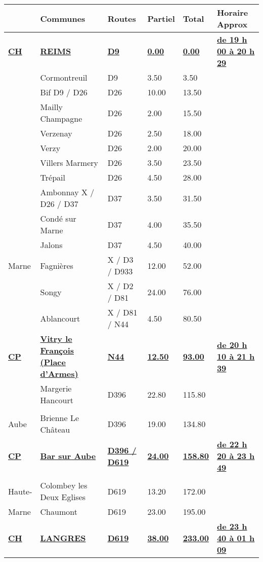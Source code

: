 \documentclass{article}%
\begin{document}
\begin{longtable}{p{2.25cm}|p{6.4cm}|p{2.3cm}|p{1.5cm}|p{1.5cm}|p{3.5cm}}%
\hline%
&Communes&Routes&Partiel&Total&Horaire Approx\\%
\hline%
\endhead%
\endfoot%
\endlastfoot%
\textbf{\underline{﻿CH}}&\textbf{\underline{REIMS}}&\textbf{\underline{D9}}&\textbf{\underline{0.00}}&\textbf{\underline{0.00}}&\textbf{\underline{de 19 h 00 à 20 h 29}}\\%
 &Cormontreuil&D9&3.50&3.50& \\%
 &Bif D9  / D26&D26&10.00&13.50& \\%
 &Mailly  Champagne&D26&2.00&15.50& \\%
 &Verzenay&D26 &2.50&18.00& \\%
 &Verzy&D26&2.00&20.00& \\%
 &Villers Marmery&D26&3.50&23.50& \\%
 &Trépail&D26&4.50&28.00& \\%
 &Ambonnay X / D26 / D37&D37&3.50&31.50& \\%
 &Condé sur Marne &D37&4.00&35.50& \\%
 &Jalons&D37&4.50&40.00& \\%
Marne&Fagnières&X / D3 / D933&12.00&52.00& \\%
 &Songy&X / D2 / D81&24.00&76.00& \\%
 &Ablancourt&X / D81 / N44&4.50&80.50& \\%
\textbf{\underline{CP}}&\textbf{\underline{Vitry le François (Place d'Armes)}}&\textbf{\underline{N44}}&\textbf{\underline{12.50}}&\textbf{\underline{93.00}}&\textbf{\underline{de 20 h 10 à  21 h 39}}\\%
 &Margerie Hancourt&D396&22.80&115.80& \\%
\hline& & & & & \\%
Aube&Brienne Le Château&D396&19.00&134.80& \\%
\textbf{\underline{CP}}&\textbf{\underline{Bar sur Aube}}&\textbf{\underline{D396 / D619}}&\textbf{\underline{24.00}}&\textbf{\underline{158.80}}&\textbf{\underline{de 22 h 20 à  23 h 49}}\\%
\hline& & & & & \\%
Haute-&Colombey les Deux Eglises&D619&13.20&172.00& \\%
Marne&Chaumont &D619&23.00&195.00& \\%
\textbf{\underline{CH}}&\textbf{\underline{LANGRES}}&\textbf{\underline{D619}}&\textbf{\underline{38.00}}&\textbf{\underline{233.00}}&\textbf{\underline{de 23 h 40 à  01 h 09}}\\%
\hline%
\end{longtable}%
\begin{flushleft} \textit{} \end{flushleft}%
\end{document}

